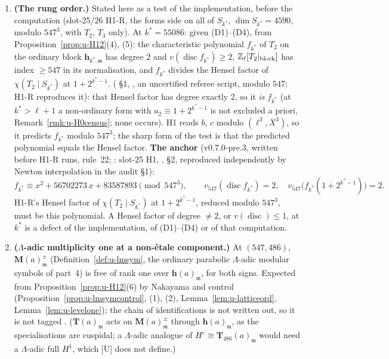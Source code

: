 \documentclass[11pt]{article}
\newcommand{\Iw}{\Lambda}                         %
\newcommand{\hcusp}{\mathbf{h}}                   %
\newcommand{\Tu}{\mathbf{T}}                      %
\newcommand{\Zl}{\Z_\ell}
\begin{document}
\begin{prediction}\label{pr:u-H1}
\begin{enumerate}
\item[(U23)] \textbf{(The rung order.)} Stated here as a test of the implementation, before the computation (slot-25/26 H1-R, the forms side on all of $S_{k^{*}}$,
  $\dim S_{k^{*}}=4590$, modulo $547^{3}$, with $T_2$, $T_3$ only). At $k^{*}=55086$:
  \PROVED{} given (D1)--(D4), from Proposition~\ref{prop:u-H12}(4), (5): the characteristic polynomial $f_{k^{*}}$ of $T_2$ on the ordinary block $\hcusp_{k^{*},\mathfrak m}$ has degree
  $2$ and $v(\operatorname{disc}f_{k^{*}})\ge2$, $\Zl[T_2|_{\mathrm{block}}]$ has index $\ge547$ in its normalisation, and $f_{k^{*}}$ divides the Hensel factor of
  $\chi(T_2\mid S_{k^{*}})$ at $1+2^{k^{*}-1}$.
  \COMP{} ( \S1, , an uncertified referee script, modulo $547$; H1-R reproduces it): that Hensel factor has degree
  exactly $2$, so it \emph{is} $f_{k^{*}}$ (at $k^{*}>\ell+1$ a non-ordinary form with $a_2\equiv1+2^{k^{*}-1}$ is not excluded a priori, Remark~\ref{rmk:u-H0census}; none occurs).
  H1 reads $b$, $c$ modulo $(\ell^{3},X^{3})$, so it predicts $f_{k^{*}}$ modulo $547^{3}$; the sharp form of the test is that the predicted polynomial equals the Hensel factor.
  \textbf{The anchor} (v0.7.0-pre.3, written before H1-R runs, rule~22; \COMP: slot-25 H1, , 
  \S2, reproduced independently by Newton interpolation in the audit  \S1):
  \[
    f_{k^{*}}\equiv x^{2}+56702273\,x+83587893\pmod{547^{3}},\qquad v_{547}(\operatorname{disc}f_{k^{*}})=2,\quad v_{547}\bigl(f_{k^{*}}(1+2^{k^{*}-1})\bigr)=2 .
  \]
  H1-R's Hensel factor of $\chi(T_2\mid S_{k^{*}})$ at $1+2^{k^{*}-1}$, reduced modulo $547^{3}$, must be this polynomial.
  A Hensel factor of degree $\ne2$, or $v(\operatorname{disc})\le1$, at $k^{*}$ is a defect of the implementation, of (D1)--(D4) or of that computation.
\item[(U24)] \textbf{($\Iw$-adic multiplicity one at a non-étale component.)} \CONJ{} At $(547,486)$, $\mathbf M(a)^{\pm}_{\mathfrak m}$ (Definition~\ref{def:u-lmsym}, the
  ordinary parabolic $\Iw$-adic modular symbols of part~4) is free of rank one over $\hcusp(a)_{\mathfrak m}$, for both signs. Expected from
  Proposition~\ref{prop:u-H12}(6) by Nakayama and control (Proposition~\ref{prop:u-lmsymcontrol}, (1), (2), Lemma~\ref{lem:u-latticeord}, Lemma~\ref{lem:u-levelone});
  the chain of identifications is not written out, so it is not tagged \PROVED. ($\Tu(a)_{\mathfrak m}$ acts on $\mathbf M(a)^{\pm}_{\mathfrak m}$ through $\hcusp(a)_{\mathfrak m}$,
  as the specialisations are cuspidal; a $\Iw$-adic analogue of $H^{\varepsilon}\cong\Tu_{486}(a)_{\mathfrak m}$ would need a $\Iw$-adic full $H^{1}$, which [U] does not define.)
\end{enumerate}
\end{prediction}
\end{document}
